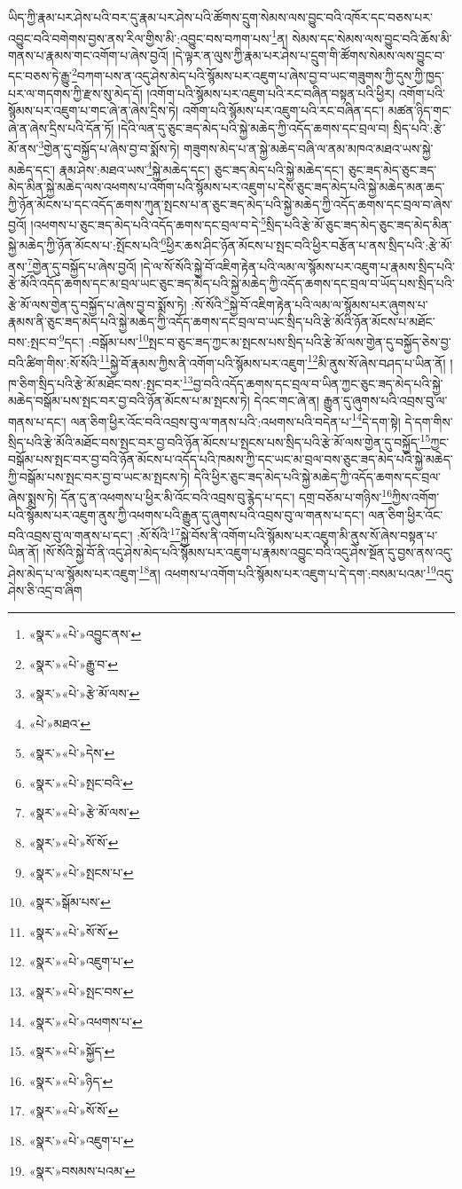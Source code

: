 ཡིད་ཀྱི་རྣམ་པར་ཤེས་པའི་བར་དུ་རྣམ་པར་ཤེས་པའི་ཚོགས་དྲུག་སེམས་ལས་བྱུང་བའི་འཁོར་དང་བཅས་པར་འབྱུང་བའི་བགེགས་བྱས་ནས་རིལ་གྱིས་མི་:འབྱུང་བས་བཀག་པས་\footnote{«སྣར་»«པེ་»འབྱུང་ནས་}ན། སེམས་དང་སེམས་ལས་བྱུང་བའི་ཆོས་མི་གནས་པ་རྣམས་གང་འགོག་པ་ཞེས་བྱའོ། །དེ་ལྟར་ན་ལུས་ཀྱི་རྣམ་པར་ཤེས་པ་དྲུག་གི་ཚོགས་སེམས་ལས་བྱུང་བ་དང་བཅས་ཏེ་རྒྱུ་\footnote{«སྣར་»«པེ་»རྒྱུ་བ་}བཀག་པས་ན་འདུ་ཤེས་མེད་པའི་སྙོམས་པར་འཇུག་པ་ཞེས་བྱ་བ་ཡང་གཟུགས་ཀྱི་དུས་ཀྱི་ཁྱད་པར་ལ་གདགས་ཀྱི་རྫས་སུ་མེད་དོ། །འགོག་པའི་སྙོམས་པར་འཇུག་པའི་རང་བཞིན་བསྟན་པའི་ཕྱིར། འགོག་པའི་སྙོམས་པར་འཇུག་པ་གང་ཞེ་ན་ཞེས་དྲིས་ཏེ། འགོག་པའི་སྙོམས་པར་འཇུག་པའི་རང་བཞིན་དང་། མཚན་ཉིད་གང་ཞེ་ན་ཞེས་དྲིས་པའི་དོན་ཏོ། །དེའི་ལན་དུ་ཅུང་ཟད་མེད་པའི་སྐྱེ་མཆེད་ཀྱི་འདོད་ཆགས་དང་བྲལ་བ། སྲིད་པའི་:རྩེ་མོ་ནས་\footnote{«སྣར་»«པེ་»རྩེ་མོ་ལས་}གྱེན་དུ་བསྐྱོད་པ་ཞེས་བྱ་བ་སྨོས་ཏེ། གཟུགས་མེད་པ་ན་སྐྱེ་མཆེད་བཞི་ལ་ནམ་མཁའ་མཐའ་ཡས་སྐྱེ་མཆེད་དང་། རྣམ་ཤེས་:མཐའ་ཡས་\footnote{«པེ་»མཐའ་}སྐྱེ་མཆེད་དང་། ཅུང་ཟད་མེད་པའི་སྐྱེ་མཆེད་དང་། ཅུང་ཟད་མེད་ཅུང་ཟད་མེད་མིན་སྐྱེ་མཆེད་ལས་འཕགས་པ་འགོག་པའི་སྙོམས་པར་འཇུག་པ་དེས་ཅུང་ཟད་མེད་པའི་སྐྱེ་མཆེད་མན་ཆད་ཀྱི་ཉོན་མོངས་པ་དང་འདོད་ཆགས་ཀུན་སྤངས་པ་ན་ཅུང་ཟད་མེད་པའི་སྐྱེ་མཆེད་ཀྱི་འདོད་ཆགས་དང་བྲལ་བ་ཞེས་བྱའོ། །འཕགས་པ་ཅུང་ཟད་མེད་པའི་འདོད་ཆགས་དང་བྲལ་བ་དེ་\footnote{«སྣར་»«པེ་»དེས་}སྲིད་པའི་རྩེ་མོ་ཅུང་ཟད་མེད་ཅུང་ཟད་མེད་མིན་སྐྱེ་མཆེད་ཀྱི་ཉོན་མོངས་པ་:སྤོངས་པའི་\footnote{«སྣར་»«པེ་»སྤང་བའི་}ཕྱིར་ཆས་ཤིང་ཉོན་མོངས་པ་སྤང་བའི་ཕྱིར་བརྩོན་པ་ནས་སྲིད་པའི་:རྩེ་མོ་ནས་\footnote{«སྣར་»«པེ་»རྩེ་མོ་ལས་}གྱེན་དུ་བསྐྱོད་པ་ཞེས་བྱའོ། །དེ་ལ་སོ་སོའི་སྐྱེ་བོ་འཇིག་རྟེན་པའི་ལམ་ལ་སྙོམས་པར་འཇུག་པ་རྣམས་སྲིད་པའི་རྩེ་མོའི་འདོད་ཆགས་དང་མ་བྲལ་ཡང་ཅུང་ཟད་མེད་པའི་སྐྱེ་མཆེད་ཀྱི་འདོད་ཆགས་དང་བྲལ་བ་ཡོད་པས་སྲིད་པའི་རྩེ་མོ་ལས་གྱེན་དུ་བསྐྱོད་པ་ཞེས་བྱ་བ་སྨོས་ཏེ། :སོ་སོའི་\footnote{«སྣར་»«པེ་»སོ་སོ་}སྐྱེ་བོ་འཇིག་རྟེན་པའི་ལམ་ལ་སྙོམས་པར་ཞུགས་པ་རྣམས་ནི་ཅུང་ཟད་མེད་པའི་སྐྱེ་མཆེད་ཀྱི་འདོད་ཆགས་དང་བྲལ་བ་ཡང་སྲིད་པའི་རྩེ་མོའི་ཉོན་མོངས་པ་མཐོང་བས་:སྤང་བ་\footnote{«སྣར་»«པེ་»སྤངས་པ་}དང་། :བསྒོམ་པས་\footnote{«སྣར་»སྒོམ་པས་}སྤང་བ་ཅུང་ཟད་ཀྱང་མ་སྤངས་པས་སྲིད་པའི་རྩེ་མོ་ལས་གྱེན་དུ་བསྐྱོད་ཅེས་བྱ་བའི་ཚིག་གིས་:སོ་སོའི་\footnote{«སྣར་»«པེ་»སོ་སོ་}སྐྱེ་བོ་རྣམས་ཀྱིས་ནི་འགོག་པའི་སྙོམས་པར་འཇུག་\footnote{«སྣར་»«པེ་»འཇུག་པ་}མི་ནུས་སོ་ཞེས་བཤད་པ་ཡིན་ནོ། །ཁ་ཅིག་སྲིད་པའི་རྩེ་མོ་མཐོང་བས་:སྤང་བར་\footnote{«སྣར་»«པེ་»སྤང་བས་}བྱ་བའི་འདོད་ཆགས་དང་བྲལ་བ་ཡིན་ཀྱང་ཅུང་ཟད་མེད་པའི་སྐྱེ་མཆེད་བསྒོམ་པས་སྤང་བར་བྱ་བའི་ཉོན་མོངས་པ་མ་སྤངས་ཏེ། དེའང་གང་ཞེ་ན། རྒྱུན་དུ་ཞུགས་པའི་འབྲས་བུ་ལ་གནས་པ་དང་། ལན་ཅིག་ཕྱིར་འོང་བའི་འབྲས་བུ་ལ་གནས་པའི་:འཕགས་པའི་བདེན་པ་\footnote{«སྣར་»«པེ་»འཕགས་པ་}དེ་དག་སྟེ། དེ་དག་གིས་སྲིད་པའི་རྩེ་མོའི་མཐོང་བས་སྤང་བར་བྱ་བའི་ཉོན་མོངས་པ་སྤངས་པས་སྲིད་པའི་རྩེ་མོ་ལས་གྱེན་དུ་བསྐྱོད་\footnote{«སྣར་»«པེ་»སྐྱོད་}ཀྱང་བསྒོམ་པས་སྤང་བར་བྱ་བའི་ཉོན་མོངས་པ་འདོད་པའི་ཁམས་ཀྱི་དང་ཡང་མ་བྲལ་བས་ཅུང་ཟད་མེད་པའི་སྐྱེ་མཆེད་ཀྱི་བསྒོམ་པས་སྤང་བར་བྱ་བ་ཡང་མ་སྤངས་ཏེ། དེའི་ཕྱིར་ཅུང་ཟད་མེད་པའི་སྐྱེ་མཆེད་ཀྱི་འདོད་ཆགས་དང་བྲལ་ཞེས་སྨྲས་ཏེ། དོན་དུ་ན་འཕགས་པ་ཕྱིར་མི་འོང་བའི་འབྲས་བུ་རྙེད་པ་དང་། དགྲ་བཅོམ་པ་གཉིས་\footnote{«སྣར་»«པེ་»ཉིད་}ཀྱིས་འགོག་པའི་སྙོམས་པར་འཇུག་ནུས་ཀྱི་འཕགས་པའི་རྒྱུན་དུ་ཞུགས་པའི་འབྲས་བུ་ལ་གནས་པ་དང་། ལན་ཅིག་ཕྱིར་འོང་བའི་འབྲས་བུ་ལ་གནས་པ་དང་། :སོ་སོའི་\footnote{«སྣར་»«པེ་»སོ་སོ་}སྐྱེ་བོས་ནི་འགོག་པའི་སྙོམས་པར་འཇུག་མི་ནུས་སོ་ཞེས་བསྟན་པ་ཡིན་ནོ། །སོ་སོའི་སྐྱེ་བོ་ནི་འདུ་ཤེས་མེད་པའི་སྙོམས་པར་འཇུག་པ་རྣམས་འབྱུང་བའི་འདུ་ཤེས་སྔོན་དུ་བྱས་ནས་འདུ་ཤེས་མེད་པ་ལ་སྙོམས་པར་འཇུག་\footnote{«སྣར་»«པེ་»འཇུག་པ་}ན། འཕགས་པ་འགོག་པའི་སྙོམས་པར་འཇུག་པ་དེ་དག་:བསམ་པའམ་\footnote{«སྣར་»བསམས་པའམ་}འདུ་ཤེས་ཅི་འདྲ་བ་ཞིག 